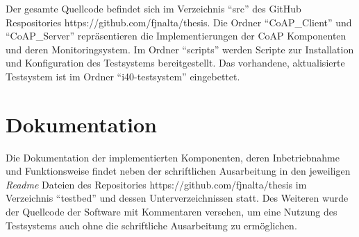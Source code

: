 Der gesamte Quellcode befindet sich im Verzeichnis "`src"' des GitHub Respositories https://github.com/fjnalta/thesis. Die Ordner "`CoAP\_Client"' und "`CoAP\_Server"' repräsentieren die Implementierungen der \ac{CoAP} Komponenten und deren Monitoringsystem. Im Ordner "`scripts"' werden Scripte zur Installation und Konfiguration des Testsystems bereitgestellt. Das vorhandene, aktualisierte Testsystem ist im Ordner "`i40-testsystem"' eingebettet.

\section{Dokumentation}
Die Dokumentation der implementierten Komponenten, deren Inbetriebnahme und Funktionsweise findet neben der schriftlichen Ausarbeitung in den jeweiligen \textit{Readme} Dateien des Repositories https://github.com/fjnalta/thesis im Verzeichnis "`testbed"' und dessen Unterverzeichnissen statt. Des Weiteren wurde der Quellcode der Software mit Kommentaren versehen, um eine Nutzung des Testsystems auch ohne die schriftliche Ausarbeitung zu ermöglichen.